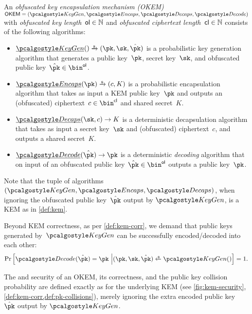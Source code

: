 \begin{definition}
    \label{def:okem}
    An \emph{obfuscated key encapsulation mechanism (OKEM)} $\OKEM = (\kgen, \encaps, \decaps, \decode)$ with \emph{obfuscated key length}~$\mathsf{ol} \in \mathbb{N}$ and \emph{obfuscated ciphertext length}~$\mathsf{cl} \in \mathbb{N}$ consists of the following algorithms:
    \begin{itemize}
        \item $\ul{\kgen}() \tor (\pk,\sk,\pkobf)$ is a probabilistic key generation algorithm that generates a public key~$\pk$, secret key~$\sk$, and obfuscated public key~$\pkobf \in \bin^\obfpklen$.

        \item $\ul{\encaps}(\pk) \tor (c, K)$ is a probabilistic encapsulation algorithm that takes as input a KEM public key~$\pk$ and outputs an (obfuscated) ciphertext~$c \in \bin^\obfctxtlen$ and shared secret~$K$.

        \item $\ul{\decaps}(\sk,c) \to K$ is a deterministic decapsulation algorithm that takes as input a secret key~$\sk$ and (obfuscated) ciphertext~$c$, and outputs a shared secret~$K$.
    
        \item $\ul{\decode}(\pkobf) \to \pk$
        is a deterministic \emph{decoding} algorithm that on input of an obfuscated public key~$\pkobf \in \bin^{\obfpklen}$ outputs a public key~$\pk$.
    \end{itemize}
    Note that the tuple of algorithms $(\kgen, \encaps, \decaps)$, when ignoring the obfuscated public key~$\pkobf$ output by $\kgen$, is a KEM as in \cref{def:kem}.

    Beyond KEM correctness, as per \cref{def:kem-corr}, we demand that public keys generated by~$\kgen$ can be successfully encoded/decoded into each other:
    \begin{align*}
        \Pr\left[
            \decode(\pkobf) = \pk
        ~\middle|
            (\pk, \sk, \pkobf) \getsr \kgen()
        \right] = 1.
    \end{align*}

\end{definition}

The \indcca and \sprcca security of an OKEM, its correctness, and the public key collision probability are defined exactly as for the underlying KEM (see \cref{fig:kem-security}, \cref{def:kem-corr,def:pk-collisions}), merely ignoring the extra encoded public key~$\pkobf$ output by $\kgen$.

